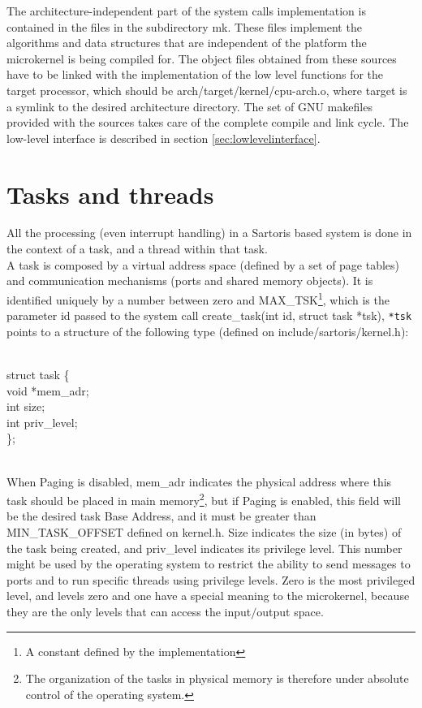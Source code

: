 \documentclass[11pt, letterpaper, twoside, english]{book}
\begin{document}
The architecture-independent part of the system calls implementation is contained in the files in the subdirectory \textsf{mk}. These files implement the algorithms and data structures that are independent of the platform the microkernel is being compiled for. The object files obtained from these sources have to be linked with the implementation of the low level functions for the target processor, which should be \textsf{arch/target/kernel/cpu-arch.o}, where \textsf{target} is a symlink to the desired architecture directory. The set of GNU makefiles provided with the sources takes care of the complete compile and link cycle. The low-level interface is described in section \ref{sec:lowlevelinterface}.

\section{Tasks and threads}
All the processing (even interrupt handling) in a Sartoris based system is done in the context of a task, and a thread within that task. \\
A task is composed by a virtual address space (defined by a set of page tables) and communication mechanisms (ports and shared memory objects). It is identified uniquely by a number between zero and \textsf{MAX\_TSK}\footnote{A constant defined by the implementation}, which is the parameter \textsf{id} passed to the system call \textsf{create\_task(int id, struct task *tsk)}, \verb|*tsk| points to a structure of the following type (defined on \textsf{include/sartoris/kernel.h}): \\
\\
\begin{sf} \noindent struct task \{ \\
\indent  void *mem\_adr; \\
\indent  int size; \\
\indent  int priv\_level; \\
\}; \\
\end{sf}
\\
\noindent 
When Paging is disabled, \textsf{mem\_adr} indicates the physical address where this task should be placed in main memory\footnote{The organization of the tasks in physical memory is therefore under absolute control of the operating system.}, but if Paging is enabled, this field will be the desired task Base Address, and it must be greater than \textsf{MIN\_TASK\_OFFSET} defined on \textsf{kernel.h}.
\textsf{Size} indicates the size (in bytes) of the task being created, and \textsf{priv\_level} indicates its privilege level. This number might be used by the operating system to restrict the ability to send messages to ports and to run specific threads using privilege levels. Zero is the most privileged level, and levels zero and one have a special meaning to the microkernel, because they are the only levels that can access the input$/$output space.\\
\end{document}
